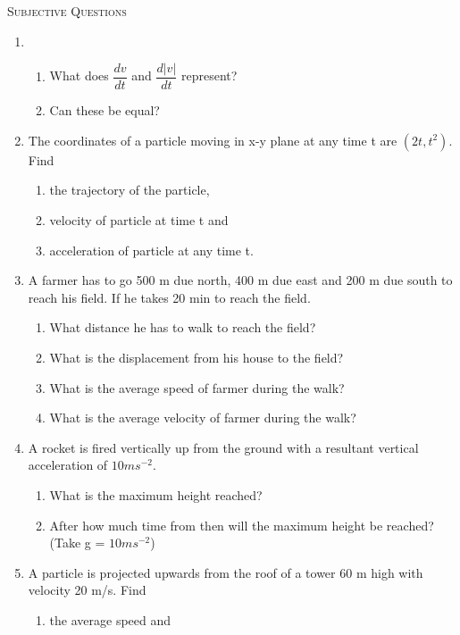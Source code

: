 \documentclass{article}
\renewcommand{\frac}[2]{\dfrac{#1}{#2}}
\begin{document}
\begin{center}
    \textsc{Subjective Questions}
\end{center}


\begin{enumerate}
    \item 
    \begin{enumerate}
        \item What does $\frac{dv}{dt}$ and $\frac{d|v|}{dt}$ represent?
        \item Can these be equal?
    \end{enumerate}
    \item The coordinates of a particle moving in x-y plane at any time t are $(2t, t^2)$. Find
    \begin{enumerate}
        \item the trajectory of the particle,
        \item velocity of particle at time t and
        \item acceleration of particle at any time t.
    \end{enumerate}
    \item A farmer has to go 500 m due north, 400 m due east and 200 m due south to reach his field. If he takes 20 min to reach the field.
    \begin{enumerate}
        \item What distance he has to walk to reach the field?
        \item What is the displacement from his house to the field?
        \item What is the average speed of farmer during the walk?
        \item What is the average velocity of farmer during the walk?
    \end{enumerate}
    \item A rocket is fired vertically up from the ground with a resultant vertical acceleration of $10 ms^{-2}$.
    \begin{enumerate}
        \item What is the maximum height reached?
        \item After how much time from then will the maximum height be reached? (Take g = $10 ms^{-2}$)
    \end{enumerate}
    \item A particle is projected upwards from the roof of a tower 60 m high with velocity 20 m/s. Find
    \begin{enumerate}
        \item the average speed and

\end{enumerate}
\end{enumerate}
\end{document}
